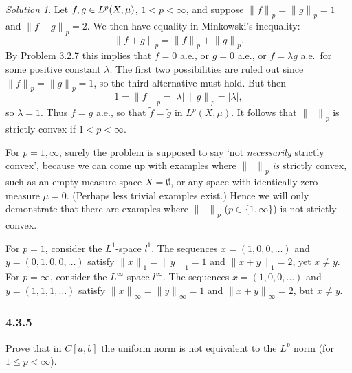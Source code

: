 \documentclass{report}
\newcommand{\norm}[1]{{\lVert #1 \rVert}}
\let\sc\relax
\newcommand{\sc}[1]{\mathscr{#1}}
\theoremstyle{remark}
\newtheorem*{solution}{Solution}
\begin{document}
\begin{solution}
  Let $f,g \in \sc L^p(X,\mu)$, $1 < p < \infty$, and suppose $\norm{f}_p = \norm{g}_p = 1$ and $\norm{f+g}_p = 2$. We then have equality in Minkowski's inequality:
  \begin{equation*}
    \norm{f+g}_p = \norm{f}_p + \norm{g}_p.
  \end{equation*}
  By Problem 3.2.7 this implies that $f = 0$ a.e., or $g = 0$ a.e., or $f = \lambda g$ a.e.\ for some positive constant $\lambda$. The first two possibilities are ruled out since $\norm{f}_p = \norm{g}_p = 1$, so the third alternative must hold. But then
  \begin{equation*}
    1 = \norm{f}_p = |\lambda| \, \norm{g}_p = |\lambda|,
  \end{equation*}
  so $\lambda = 1$. Thus $f = g$ a.e., so that $\tilde f = \tilde g$ in $L^p(X,\mu)$. It follows that $\norm{\phantom x}_p$ is strictly convex if $1 < p < \infty$.

  For $p = 1, \infty$, surely the problem is supposed to say `not \emph{necessarily} strictly convex', because we can come up with examples where $\norm{\phantom x}_p$ \emph{is} strictly convex, such as an empty measure space $X = \emptyset$, or any space with identically zero measure $\mu = 0$. (Perhaps less trivial examples exist.) Hence we will only demonstrate that there are examples where $\norm{\phantom x}_p$ ($p \in \{1,\infty\}$) is not strictly convex.

  For $p = 1$, consider the $L^1$-space $l^1$. The sequences $x = (1,0,0,\dots)$ and $y = (0,1,0,0,\dots)$ satisfy $\norm{x}_1 = \norm{y}_1 = 1$ and $\norm{x + y}_1 = 2$, yet $x \ne y$. For $p = \infty$, consider the $L^\infty$-space $l^\infty$. The sequences $x = (1,0,0,\dots)$ and $y = (1,1,1,\dots)$ satisfy $\norm{x}_\infty = \norm{y}_\infty = 1$ and $\norm{x+y}_\infty = 2$, but $x \ne y$.
\end{solution}

\subsubsection*{4.3.5}
Prove that in $C[a,b]$ the uniform norm is not equivalent to the $L^p$ norm (for $1 \le p < \infty$).
\end{document}
